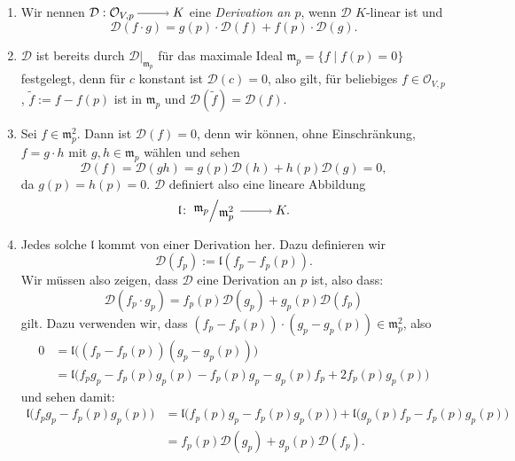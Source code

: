 \documentclass[a4paper,12pt,index=toc]{scrbook}
\theoremstyle{keinenummern} %
\def\O{\mathcal{O}}
\newcommand{\DD}{\mathcal{D}} %
\def\l{\mathfrak{l}}
\def\m{\mathfrak{m}}
\newcommand{\restrict}[1]{|_{#1}}
\newcommand{\schlange}[1]{\widetilde{#1}}
\begin{document}
\begin{db}\label{3.3.7}
\begin{enumerate}
\item{} Wir nennen $\DD:\O_{V,p}\ra K$ eine \emph{Derivation an $p$}, wenn $\DD$ $K$-linear ist und 
\begin{equation*}\DD(f\cdot g)=g(p)\cdot\DD(f)+f(p)\cdot\DD(g).\end{equation*}
\item{} $\DD$ ist bereits durch $\DD\restrict{\m_{p}}$ für das maximale Ideal $\m_{p}=\{f\mid f(p)=0\}$ festgelegt, denn für $c$ konstant ist $\DD(c)=0$, also gilt, für beliebiges $f\in\O_{V,p}$, $\schlange{f}:=f-f(p)$ ist in $\m_{p}$ und $\DD(\schlange{f})=\DD(f)$.
\item{} Sei $f\in\m_{p}^{2}$. Dann ist $\DD(f)=0$, denn wir können, ohne Einschränkung, $f=g\cdot h$ mit $g,h\in\m_{p}$ wählen und sehen
\begin{equation*}\DD(f)=\DD(gh)=g(p)\DD(h)+h(p)\DD(g)=0,\end{equation*}
da $g(p)=h(p)=0$. $\DD$ definiert also eine lineare Abbildung
\begin{equation*}\l\colon\Quotient{\m_{p}}{\m_{p}^{2}}\ra K.\end{equation*}
\item{} Jedes solche $\l$ kommt von einer Derivation her. Dazu definieren wir \begin{equation*}\DD(f_{p}):=\l(f_{p}-f_{p}(p)).\end{equation*}
%
Wir müssen also zeigen, dass $\DD$ eine Derivation an $p$ ist, also dass:
\begin{equation*}\DD(f_{p}\cdot g_{p})=f_{p}(p)\DD(g_{p})+g_{p}(p)\DD(f_{p})\end{equation*}
gilt. Dazu verwenden wir, dass $(f_{p}-f_{p}(p))\cdot(g_{p}-g_{p}(p))\in\m_{p}^{2}$, also
\begin{align*}
0&=\l\bigl((f_{p}-f_{p}(p))(g_{p}-g_{p}(p))\bigr)\\
&=\l\bigr(f_{p}g_{p}-f_{p}(p)g_{p}(p)-f_{p}(p)g_{p}-g_{p}(p)f_{p}+2f_{p}(p)g_{p}(p)\bigl)
\end{align*}
 und sehen damit:
\begin{align*}
\l\bigl(f_{p}g_{p}-f_{p}(p)g_{p}(p)\bigr)&=\l\bigl(f_{p}(p)g_{p}-f_{p}(p)g_{p}(p)\bigr) + \l\bigl(g_{p}(p)f_{p}-f_{p}(p)g_{p}(p)\bigr)\\
&=f_{p}(p)\DD(g_{p})+g_{p}(p)\DD(f_{p}).
\end{align*}
\end{enumerate}\end{db}
\end{document}
